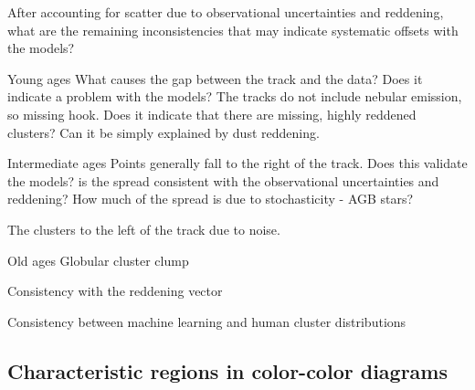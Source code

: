 After accounting for scatter due to observational uncertainties and reddening, what are the remaining inconsistencies that may indicate systematic offsets with the models?

Young ages
What causes the gap between the track and the data?
Does it indicate a problem with the models?  The tracks do not include nebular emission, so missing hook.
Does it indicate that there are missing, highly reddened clusters?
Can it be simply explained by dust reddening.

Intermediate ages
Points generally fall to the right of the track.
Does this validate the models?
is the spread consistent with the observational uncertainties and reddening?
How much of the spread is due to stochasticity - AGB stars?

The clusters to the left of the track due to noise.


Old ages
Globular cluster clump

Consistency with the reddening vector

Consistency between machine learning and human cluster distributions







\subsection{Characteristic regions in color-color diagrams}\label{ssect:color_color_regions}












